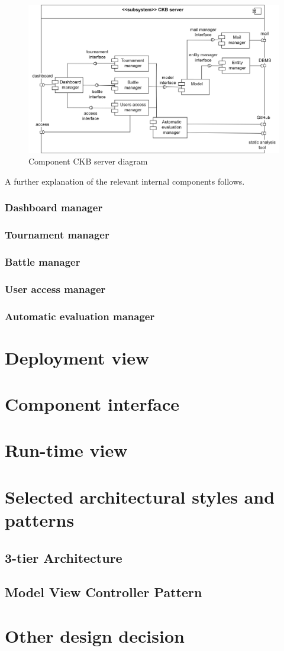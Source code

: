 \begin{figure}[h]
    \centering
    \includegraphics[width=\textwidth]{images/component-CKBserver.png}
    \caption{Component CKB server diagram}
    \label{fig:comp-CKBserver}
\end{figure}

A further explanation of the relevant internal components follows.

\subsubsection*{Dashboard manager}
\subsubsection*{Tournament manager}
\subsubsection*{Battle manager}
\subsubsection*{User access manager}
\subsubsection*{Automatic evaluation manager}

\clearpage
\section{Deployment view}
\section{Component interface}
\section{Run-time view}
\section{Selected architectural styles and patterns}
\subsection*{3-tier Architecture}
\subsection*{Model View Controller Pattern}
\section{Other design decision}